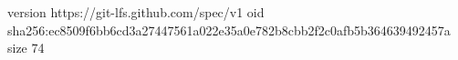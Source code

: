 version https://git-lfs.github.com/spec/v1
oid sha256:ec8509f6bb6cd3a27447561a022e35a0e782b8cbb2f2c0afb5b364639492457a
size 74
